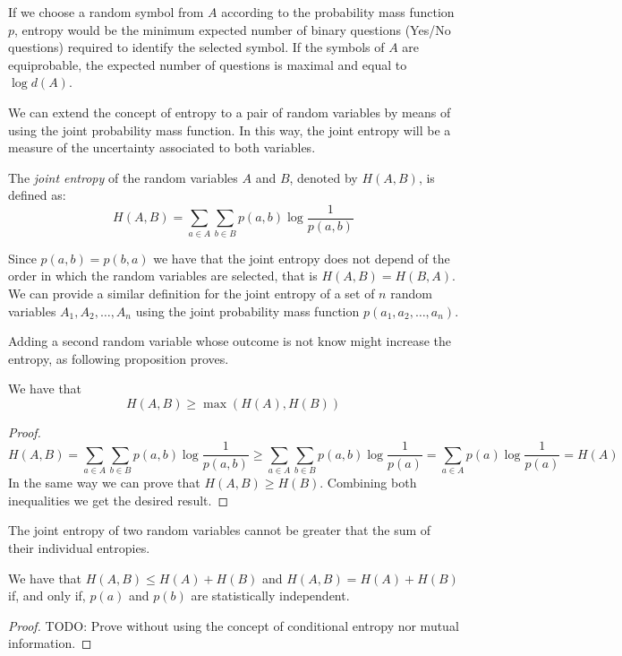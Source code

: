 \begin{example}
If we choose a random symbol from $A$ according to the probability mass function $p$, entropy would be the minimum expected number of binary questions (Yes/No questions) required to identify the selected symbol. If the symbols of $A$ are equiprobable, the expected number of questions is maximal and equal to $\log d(A)$.
\end{example}

We can extend the concept of entropy to a pair of random variables by means of using the joint probability mass function. In this way, the joint entropy will be a measure of the uncertainty associated to both variables.

\begin{definition}
The \emph{joint entropy} of the random variables $A$ and $B$, denoted by $H(A, B)$, is defined as:
\[
H(A, B) = \sum_{a \in A} \sum_{b \in B} p(a, b) \log \frac{1}{p(a, b)}
\]
\end{definition}

Since $p(a, b) = p(b, a)$ we have that the joint entropy does not depend of the order in which the random variables are selected, that is $H(A, B) = H(B, A)$. We can provide a similar definition for the joint entropy of a set of $n$ random variables $A_1, A_2, \ldots, A_n$ using the joint probability mass function $p(a_1, a_2, \ldots, a_n)$.

Adding a second random variable whose outcome is not know might increase the entropy, as following proposition proves.

\begin{proposition}
We have that
\[
H(A, B) \geq \max \left( H(A), H(B) \right)
\]
\end{proposition}
\begin{proof}
\[
H(A, B) = \sum_{a \in A} \sum_{b \in B} p(a,b) \log \frac{1}{p(a,b)} \geq \sum_{a \in A} \sum_{b \in B} p(a,b) \log \frac{1}{p(a)} = \sum_{a \in A} p(a) \log \frac{1}{p(a)} = H(A)
\]
In the same way we can prove that $H(A, B) \geq H(B)$. Combining both inequalities we get the desired result.
\end{proof}

The joint entropy of two random variables cannot be greater that the sum of their individual entropies.

\begin{proposition}
\label{prop:joint_entropy}
We have that $H(A, B) \leq H(A) + H(B)$ and $H(A, B) = H(A) + H(B)$ if, and only if, $p(a)$ and $p(b)$ are statistically independent.
\end{proposition}
\begin{proof}
{\color{red} TODO: Prove without using the concept of conditional entropy nor mutual information.}
\end{proof}

